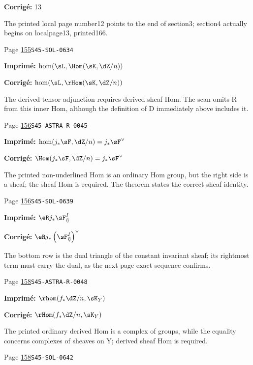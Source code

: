 \begin{description}
\par\noindent\textbf{Corrigé:} 13
\par\noindent The printed local page number12 points to the end of section3; section4 actually begins on localpage13, printed166.
\smallskip
\item[\hypertarget{apparatus:FR-0124}{124}] Page \hyperlink{printpage:fr:155}{155}\quad\texttt{S45-SOL-0634}
\par\noindent\textbf{Imprimé:} \(\hom(\sL,\Hom(\sK,\dZ/n))\)
\par\noindent\textbf{Corrigé:} \(\hom(\sL,\rHom(\sK,\dZ/n))\)
\par\noindent The derived tensor adjunction requires derived sheaf Hom. The scan omits R from this inner Hom, although the definition of D immediately above includes it.
\smallskip
\item[\hypertarget{apparatus:FR-0125}{125}] Page \hyperlink{printpage:fr:156}{156}\quad\texttt{S45-ASTRA-R-0045}
\par\noindent\textbf{Imprimé:} \(\hom(j_\ast\sF,\dZ/n)=j_\ast\sF^\vee\)
\par\noindent\textbf{Corrigé:} \(\Hom(j_\ast\sF,\dZ/n)=j_\ast\sF^\vee\)
\par\noindent The printed non-underlined Hom is an ordinary Hom group, but the right side is a sheaf; the sheaf Hom is required. The theorem states the correct sheaf identity.
\smallskip
\item[\hypertarget{apparatus:FR-0126}{126}] Page \hyperlink{printpage:fr:156}{156}\quad\texttt{S45-SOL-0639}
\par\noindent\textbf{Imprimé:} \(\eR j_\ast \sF_{\bar\eta}^I\)
\par\noindent\textbf{Corrigé:} \(\eR j_\ast\left(\sF_{\bar\eta}^I\right)^\vee\)
\par\noindent The bottom row is the dual triangle of the constant invariant sheaf; its rightmost term must carry the dual, as the next-page exact sequence confirms.
\smallskip
\item[\hypertarget{apparatus:FR-0127}{127}] Page \hyperlink{printpage:fr:158}{158}\quad\texttt{S45-ASTRA-R-0048}
\par\noindent\textbf{Imprimé:} \(\rhom(f_\ast\dZ/n,\sK_Y)\)
\par\noindent\textbf{Corrigé:} \(\rHom(f_\ast\dZ/n,\sK_Y)\)
\par\noindent The printed ordinary derived Hom is a complex of groups, while the equality concerns complexes of sheaves on Y; derived sheaf Hom is required.
\smallskip
\item[\hypertarget{apparatus:FR-0128}{128}] Page \hyperlink{printpage:fr:158}{158}\quad\texttt{S45-SOL-0642}

\end{description}
